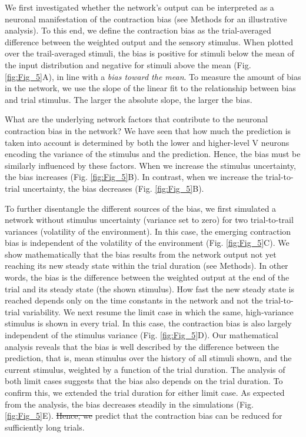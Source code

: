 \documentclass[10pt,a4paper]{article}
\providecommand{\DIFaddtex}[1]{{\protect\color{blue}\uwave{#1}}} %
\providecommand{\DIFdeltex}[1]{{\protect\color{red}\sout{#1}}}                      %
\providecommand{\DIFaddbegin}{} %
\providecommand{\DIFaddend}{} %
\providecommand{\DIFdelbegin}{} %
\providecommand{\DIFdelend}{} %
\providecommand{\DIFadd}[1]{\texorpdfstring{\DIFaddtex{#1}}{#1}} %
\providecommand{\DIFdel}[1]{\texorpdfstring{\DIFdeltex{#1}}{}} %
\newcommand{\DIFscaledelfig}{0.5}
\newlength{\DIFdelgraphicswidth} %
\newlength{\DIFdelgraphicsheight} %
\newcommand{\DIFaddincludegraphics}[2][]{{\color{blue}\fbox{\DIFOincludegraphics[#1]{#2}}}} %
\newcommand{\DIFdelincludegraphics}[2][]{%
\sbox{\DIFdelgraphicsbox}{\DIFOincludegraphics[#1]{#2}}%
\settoboxwidth{\DIFdelgraphicswidth}{\DIFdelgraphicsbox} %
\settoboxtotalheight{\DIFdelgraphicsheight}{\DIFdelgraphicsbox} %
\scalebox{\DIFscaledelfig}{%
\parbox[b]{\DIFdelgraphicswidth}{\usebox{\DIFdelgraphicsbox}\\[-\baselineskip] \rule{\DIFdelgraphicswidth}{0em}}\llap{\resizebox{\DIFdelgraphicswidth}{\DIFdelgraphicsheight}{%
\setlength{\unitlength}{\DIFdelgraphicswidth}%
\begin{picture}(1,1)%
\thicklines\linethickness{2pt} %
{\color[rgb]{1,0,0}\put(0,0){\framebox(1,1){}}}%
{\color[rgb]{1,0,0}\put(0,0){\line( 1,1){1}}}%
{\color[rgb]{1,0,0}\put(0,1){\line(1,-1){1}}}%
\end{picture}%
}\hspace*{3pt}}} %
} %
\DeclareRobustCommand{\DIFaddbegin}{\DIFOaddbegin \let\includegraphics\DIFaddincludegraphics} %
\DeclareRobustCommand{\DIFaddend}{\DIFOaddend \let\includegraphics\DIFOincludegraphics} %
\DeclareRobustCommand{\DIFdelbegin}{\DIFOdelbegin \let\includegraphics\DIFdelincludegraphics} %
\DeclareRobustCommand{\DIFdelend}{\DIFOaddend \let\includegraphics\DIFOincludegraphics} %
\begin{document}
We first investigated whether the network's output can be interpreted as a neuronal manifestation of the contraction bias (see Methods for an illustrative analysis). To this end, we define the contraction bias as the trial-averaged difference between the weighted output and the sensory stimulus. When plotted over the trail-averaged stimuli, the bias is positive for stimuli below the mean of the input distribution and negative for stimuli above the mean (Fig. \ref{fig:Fig_5}A), in line with a \textit{bias toward the mean}. To measure the amount of bias in the network, we use the slope of the linear fit to the relationship between bias and trial stimulus. The larger the absolute slope, the larger the bias. 

What are the underlying network factors that contribute to the neuronal contraction bias in the network? We have seen that how much the prediction is taken into account is determined by both the lower and higher-level V neurons encoding the variance of the stimulus and the prediction. Hence, the bias must be similarly influenced by these factors. When we increase the stimulus uncertainty, the bias increases (Fig. \ref{fig:Fig_5}B). In contrast, when we increase the trial-to-trial uncertainty, the bias decreases (Fig. \ref{fig:Fig_5}B). 

To further disentangle the different sources of the bias, we first simulated a network without stimulus uncertainty (variance set to zero) for two trial-to-trail variances (volatility of the environment). In this case, the emerging contraction bias is independent of the volatility of the environment (Fig. \ref{fig:Fig_5}C). We show mathematically that the bias results from the network output not yet reaching its new steady state within the trial duration (see Methods). In other words, the bias is the difference between the weighted output at the end of the trial and its steady state (the shown stimulus). How fast the new steady state is reached depends only on the time constants in the network and not the trial-to-trial variability. We next resume the limit case in which the same, high-variance stimulus is shown in every trial. In this case, the contraction bias is also largely independent of the stimulus variance (Fig. \ref{fig:Fig_5}D). Our mathematical analysis reveals that the bias is well described by the difference between the prediction, that is, mean stimulus over the history of all stimuli shown, and the current stimulus, weighted by a function of the trial duration. The analysis of both limit cases suggests that the bias also depends on the trial duration. To confirm this, we extended the trial duration for either limit case. As expected from the analysis, the bias decreases steadily in the simulations (Fig. \ref{fig:Fig_5}E). \DIFdelbegin \DIFdel{Hence, we }\DIFdelend \DIFaddbegin \DIFadd{We, therefore, }\DIFaddend predict that the contraction bias can be reduced for sufficiently long trials. 
\end{document}
